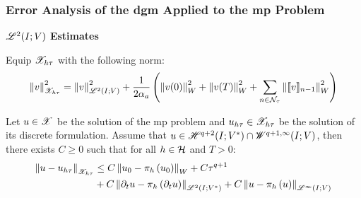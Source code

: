 \begin{frame}
    \frametitle{Error Analysis of the \acrshort{dgm} Applied to the \acrshort{mp} Problem}

    \vspace*{\fill}
    \begin{center}
        {\color{\accentcolor} \Large $\mathscr{L}^{2}(I; V)$ \textbf{Estimates}}
        \vspace*{0.25cm}

        \begin{minipage}{0.75\textwidth}
            \begin{definition}
                Equip $\mathscr{X}_{h \tau}$ with the following norm:
                \begin{align*}
                    \left\lVert v \right\rVert_{\mathscr{X}_{h \tau}}^2 = \left\lVert v \right\rVert_{\mathscr{L}^{2}(I; V)}^2 + \frac{1}{2 \alpha_{a}} \left( \left\lVert v(0) \right\rVert_W^2 + \left\lVert v(T) \right\rVert_W^2 + \sum_{n \in \mathcal{N}_{\tau}} \left\lVert \llbracket v \rrbracket_{n - 1} \right\rVert_W^2 \right)
                \end{align*}
            \end{definition}
        \end{minipage}
    \end{center}

    \vspace*{\fill}

    \begin{center}
        \begin{minipage}{0.75\textwidth}
            \begin{theorem}
                Let $u \in \mathscr{X}$ be the solution of the \acrshort{mp} problem and $u_{h \tau} \in \mathscr{X}_{h \tau}$ be the solution of its discrete formulation. Assume that $u \in \mathscr{H}^{q + 2}(I; V^*) \cap \mathscr{W}^{q + 1, \infty}(I; V)$, then there exists $C \geq 0$ such that for all $h \in \mathcal{H}$ and $T > 0$:
                \begin{align*}
                    \left\lVert u - u_{h \tau} \right\rVert_{\mathscr{X}_{h \tau}} & \leq C \left\lVert u_0 - \pi_h \left( u_0 \right) \right\rVert_W + C \tau^{q + 1} \\
                    & + C \left\lVert \partial_t u - \pi_h \left( \partial_t u \right) \right\rVert_{\mathscr{L}^{2}(I; V^*)} + C \left\lVert u - \pi_h \left( u \right) \right\rVert_{\mathscr{L}^{\infty}(I; V)}
                \end{align*}
            \end{theorem}
        \end{minipage}
    \end{center}
    \vspace*{\fill}
    
\end{frame}

